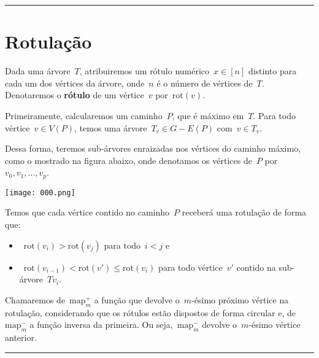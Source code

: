\documentclass[a0,portrait]{a0poster}
\newcommand{\rot}{\mathrm{rot}}
\newcommand{\map}{\mathrm{map}}
\begin{document}
\begin{multicols}{3}
\noindent\rule[0.5ex]{\linewidth}{1pt}



\section*{Rotulação}

    Dada uma árvore~$T$, atribuiremos um 
    rótulo numérico~${x\in [n]}$ distinto para cada um dos vértices 
    da árvore, onde~$n$ é o número de vértices de~$T$. 
    Denotaremos o \textbf{rótulo} de um vértice~$v$ por~$\rot(v)$.

    Primeiramente, calcularemos 
    um caminho~$P$, que é máximo em~$T$. 
    Para todo vértice~${v\in V(P)}$, temos uma 
    árvore~${T_v \in G - E(P)}$ com~$v\in T_v$.

    Dessa forma, teremos sub-árvores enraizadas nos vértices do
    caminho máximo, como o mostrado na figura abaixo, onde denotamos
    os vértices de~$P$ por~${v_0,v_1,\ldots,v_p}$.
    
\begin{center}
\texttt{[image: 000.png]}
\end{center}

    Temos que cada vértice contido no caminho~$P$ receberá 
    uma rotulação de forma que:
    \begin{itemize}
        \item~${\rot(v_i)>\rot(v_j)}$ para todo~${i<j}$ e
        \item~${\rot(v_{i-1})<\rot(v') \le \rot(v_i)}$ para todo 
        vértice~$v'$ contido na sub-árvore~$T{v_i}$. 
    \end{itemize}
    
    Chamaremos de~${\map^+_m}$ a função que devolve o~$m$-ésimo 
    próximo vértice na rotulação, considerando que os rótulos
    estão dispostos de forma circular
    e, de~${\map^-_m}$ a função inversa da primeira. 
    Ou seja,~${\map^-_m}$ devolve o~$m$-ésimo vértice anterior.

\noindent\rule[0.5ex]{\linewidth}{1pt}




\end{multicols}
\end{document}

